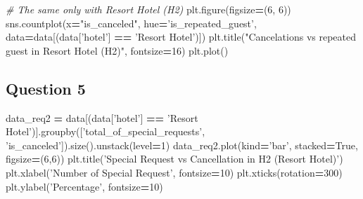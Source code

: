 \documentclass[10pt,a4paper]{article}
\newenvironment{Shaded}{\begin{snugshade}}{\end{snugshade}}
\newcommand{\CommentTok}[1]{\textcolor[rgb]{0.56,0.35,0.01}{\textit{#1}}}
\newcommand{\DecValTok}[1]{\textcolor[rgb]{0.00,0.00,0.81}{#1}}
\newcommand{\NormalTok}[1]{#1}
\newcommand{\OperatorTok}[1]{\textcolor[rgb]{0.81,0.36,0.00}{\textbf{#1}}}
\newcommand{\StringTok}[1]{\textcolor[rgb]{0.31,0.60,0.02}{#1}}
\newcommand{\VariableTok}[1]{\textcolor[rgb]{0.00,0.00,0.00}{#1}}
\theoremstyle{break}
\begin{document}
\begin{Shaded}
\begin{Highlighting}[]
\CommentTok{# The same only with Resort Hotel (H2)}
\NormalTok{plt.figure(figsize}\OperatorTok{=}\NormalTok{(}\DecValTok{6}\NormalTok{, }\DecValTok{6}\NormalTok{))}
\NormalTok{sns.countplot(x}\OperatorTok{=}\StringTok{"is_canceled"}\NormalTok{, hue}\OperatorTok{=}\StringTok{'is_repeated_guest'}\NormalTok{, data}\OperatorTok{=}\NormalTok{data[(data[}\StringTok{'hotel'}\NormalTok{] }\OperatorTok{==} \StringTok{'Resort Hotel'}\NormalTok{)])}
\NormalTok{plt.title(}\StringTok{"Cancelations vs repeated guest in Resort Hotel (H2)"}\NormalTok{, fontsize}\OperatorTok{=}\DecValTok{16}\NormalTok{)}
\NormalTok{plt.plot()}
\end{Highlighting}
\end{Shaded}

\hypertarget{question-5}{%
\subsection{Question 5}\label{question-5}}

\begin{Shaded}
\begin{Highlighting}[]
\NormalTok{data_req2 }\OperatorTok{=}\NormalTok{ data[(data[}\StringTok{'hotel'}\NormalTok{] }\OperatorTok{==} \StringTok{'Resort Hotel'}\NormalTok{)].groupby([}\StringTok{'total_of_special_requests'}\NormalTok{,}
                                                             \StringTok{'is_canceled'}\NormalTok{]).size().unstack(level}\OperatorTok{=}\DecValTok{1}\NormalTok{)}
\NormalTok{data_req2.plot(kind}\OperatorTok{=}\StringTok{'bar'}\NormalTok{, stacked}\OperatorTok{=}\VariableTok{True}\NormalTok{, figsize}\OperatorTok{=}\NormalTok{(}\DecValTok{6}\NormalTok{,}\DecValTok{6}\NormalTok{))}
\NormalTok{plt.title(}\StringTok{'Special Request vs Cancellation in H2 (Resort Hotel)'}\NormalTok{)}
\NormalTok{plt.xlabel(}\StringTok{'Number of Special Request'}\NormalTok{, fontsize}\OperatorTok{=}\DecValTok{10}\NormalTok{)}
\NormalTok{plt.xticks(rotation}\OperatorTok{=}\DecValTok{300}\NormalTok{)}
\NormalTok{plt.ylabel(}\StringTok{'Percentage'}\NormalTok{, fontsize}\OperatorTok{=}\DecValTok{10}\NormalTok{)}
\end{Highlighting}
\end{Shaded}
\end{document}
